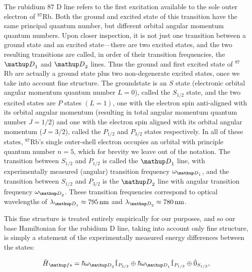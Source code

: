 The rubidium 87 D line refers to the first excitation available to the sole outer electron of $^{87}$Rb. Both the ground and excited state of this transition have the same principal quantum number, but different orbital angular momentum quantum numbers. Upon closer inspection, it is not just one transition between a ground state and an excited state---there are two excited states, and the two resulting transitions are called, in order of their transition frequencies, the $\up{D}_1$ and  $\up{D}_2$ lines. Thus the ground and first excited state of $^{87}$Rb are actually a ground state plus two non-degenerate excited states, once we take into account fine structure. The groundstate is an $S$ state (electronic orbital angular momentum quantum number $L=0$), called the $S_{1/2}$ state, and the two excited states are $P$ states $(L=1)$, one with the electron spin anti-aligned with its orbital angular momentum (resulting in total angular momentum quantum number $J=1/2$) and one with the electron spin aligned with its orbital angular momentum ($J=3/2$), called the $P_{1/2}$ and $P_{3/2}$ states respectively. In all of these states, $^{87}$Rb's single outer-shell electron occupies an orbital with principle quantum number $n=5$, which for brevity we leave out of the notation. The transition between $S_{1/2}$ and $P_{1/2}$ is called the $\up{D}_1$ line, with experimentally measured (angular) transition frequency $\omega_{\up{D}_1}$, and the transition between $S_{1/2}$ and $P_{3/2}$ is the $\up{D}_2$ line with angular transition frequency $\omega_{\up{D}_2}$. These transition frequencies correspond to optical wavelengths of $\lambda_{\up{D}_1} \approx 795\unit{nm}$ and $\lambda_{\up{D}_2} \approx 780\unit{nm}$\cite{steck_rubidium_2015}.

This fine structure is treated entirely empirically for our purposes, and so our base Hamiltonian for the rubidium D line, taking into account only fine structure, is simply a statement of the experimentally measured energy differences between the states:

\begin{align}
\hat H_\up{fs} = 
\hbar\omega_{\up{D}_2} \hat1_{P_{3/2}} \oplus
\hbar\omega_{\up{D}_1} \hat1_{P_{1/2}} \oplus
\hat 0_{S_{1/2}},
\end{align}

